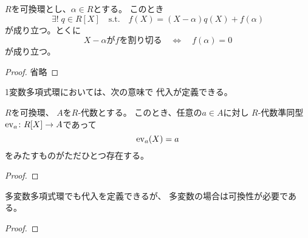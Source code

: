 \documentclass[report]{jlreq}
\begin{document}

\begin{corollary}[剰余定理]
    $R$を可換環とし、$\alpha \in R$とする。
    このとき
    \begin{equation}
        \exists! \; q \in R[X]
        \quad \text{s.t.} \quad
        f(X) = (X - \alpha) q(X) + f(\alpha)
    \end{equation}
    が成り立つ。とくに
    \begin{equation}
        \text{$X - \alpha$が$f$を割り切る}
        \quad \iff \quad
        f(\alpha) = 0
    \end{equation}
    が成り立つ。
\end{corollary}

\begin{proof}
    省略
\end{proof}

1変数多項式環においては、次の意味で
代入が定義できる。

\begin{theorem}[1変数多項式環の普遍性]
    $R$を可換環、
    $A$を$R$-代数とする。
    このとき、任意の$a \in A$に対し
    $R$-代数準同型$\mathrm{ev}_a \colon R[X] \to A$であって
    \begin{equation}
        \mathrm{ev}_a(X) = a
    \end{equation}
    をみたすものがただひとつ存在する。
\end{theorem}

\begin{proof}
    \TODO{}
\end{proof}

多変数多項式環でも代入を定義できるが、
多変数の場合は可換性が必要である。


\begin{proof}
\end{proof}
\end{document}
